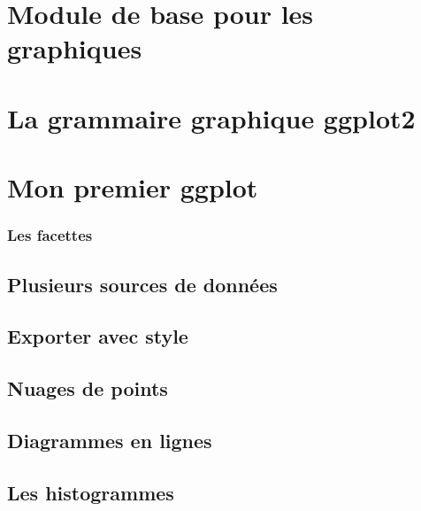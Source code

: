 \documentclass[]{book}
\begin{document}
\hypertarget{module-de-base-pour-les-graphiques}{%
\section{Module de base pour les
graphiques}\label{module-de-base-pour-les-graphiques}}

\hypertarget{la-grammaire-graphique-ggplot2}{%
\section{La grammaire graphique
ggplot2}\label{la-grammaire-graphique-ggplot2}}

\hypertarget{mon-premier-ggplot}{%
\section{Mon premier ggplot}\label{mon-premier-ggplot}}

\hypertarget{les-facettes}{%
\subsubsection{Les facettes}\label{les-facettes}}

\hypertarget{plusieurs-sources-de-donnuxe9es}{%
\subsection{Plusieurs sources de
données}\label{plusieurs-sources-de-donnuxe9es}}

\hypertarget{exporter-avec-style}{%
\subsection{Exporter avec style}\label{exporter-avec-style}}

\hypertarget{nuages-de-points}{%
\subsection{Nuages de points}\label{nuages-de-points}}

\hypertarget{diagrammes-en-lignes}{%
\subsection{Diagrammes en lignes}\label{diagrammes-en-lignes}}

\hypertarget{les-histogrammes}{%
\subsection{Les histogrammes}\label{les-histogrammes}}
\end{document}

